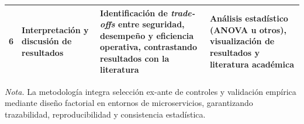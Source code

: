 \begin{table}[htbp]
\begin{tabular}{p{1cm} p{4cm} p{4.5cm} p{4.5cm}}
6 
& Interpretación y discusión de resultados 
& Identificación de \textit{trade-offs} entre seguridad, desempeño y eficiencia operativa, contrastando resultados con la literatura 
& Análisis estadístico (ANOVA u otros), visualización de resultados y literatura académica \\

\hline
\end{tabular}

\vspace{0.2cm}
{\raggedright \small \textit{Nota.} La metodología integra selección ex-ante de controles y validación empírica mediante diseño factorial en entornos de microservicios, garantizando trazabilidad, reproducibilidad y consistencia estadística.\par}

\end{table}